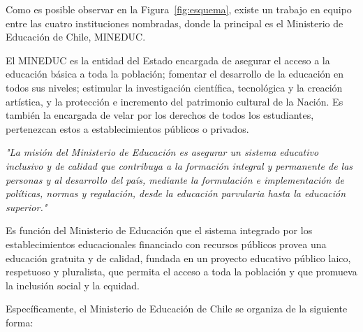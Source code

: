 Como es posible observar en la Figura~\ref{fig:esquema}, existe un trabajo en equipo entre las cuatro instituciones nombradas, donde la principal es el Ministerio de Educación de Chile, MINEDUC.

El MINEDUC es la entidad del Estado encargada de asegurar el acceso a la educación básica a toda la población; fomentar el desarrollo de la educación en todos sus niveles; estimular la investigación científica, tecnológica y la creación artística, y la protección e incremento del patrimonio cultural de la Nación. Es también la encargada de velar por los derechos de todos los estudiantes, pertenezcan estos a establecimientos públicos o privados. 


\textit{"La misión del Ministerio de Educación es asegurar un sistema educativo inclusivo y de calidad que contribuya a la formación integral y permanente de las personas y al desarrollo del país, mediante la formulación e implementación de políticas, normas y regulación, desde la educación parvularia hasta la educación superior."} \cite{misionmineduc}

Es función del Ministerio de Educación que el sistema integrado por los establecimientos educacionales financiado con recursos públicos provea una educación gratuita y de calidad, fundada en un proyecto educativo público laico, respetuoso y pluralista, que permita el acceso a toda la población y que promueva la inclusión social y la equidad. 

Específicamente, el Ministerio de Educación de Chile se organiza de la siguiente forma\cite{orgmineduc}:

